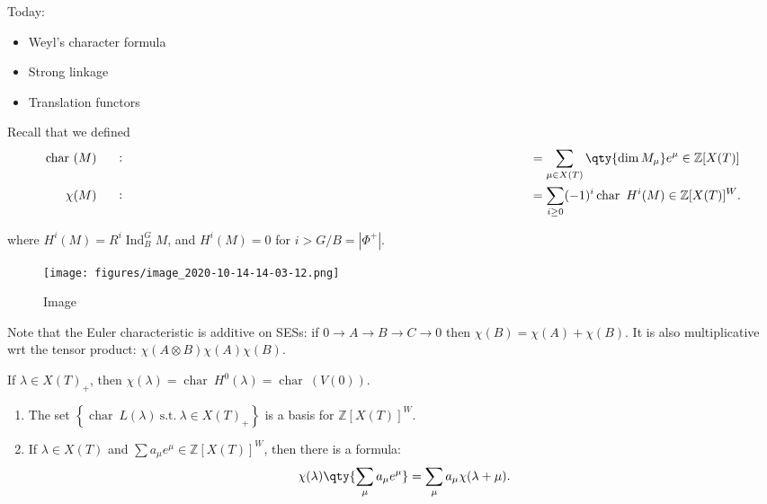 Today:

\begin{itemize}
\item
  Weyl's character formula
\item
  Strong linkage
\item
  Translation functors
\end{itemize}

Recall that we defined
\begin{align*}   \operatorname{char}~(M) &\mathrel{\vcenter{:}}=\sum_{\mu \in X(T)} \qty{\dim M_\mu} e^{\mu} \in {\mathbb{Z}}[X(T)]\\ \chi(M) &\mathrel{\vcenter{:}}=\sum_{i\geq 0} (-1)^i \operatorname{char}~H^i(M) \in {\mathbb{Z}}[X(T)]^W .\end{align*}

where \(H^i(M) = R^i \operatorname{Ind}_B^G M\), and \(H^i(M) =0\) for
\(i> G/B = {\left\lvert {\Phi^+} \right\rvert}\).

\begin{figure}
\centering
\texttt{[image: figures/image\_2020-10-14-14-03-12.png]}
\caption{Image}
\end{figure}

Note that the Euler characteristic is additive on SESs: if
\(0\to A\to B\to C\to 0\) then \(\chi(B) = \chi(A) + \chi(B)\). It is
also multiplicative wrt the tensor product:
\(\chi(A\otimes B) \chi(A) \chi(B)\).


\begin{remark}

\begin{remark}

If \(\lambda \in X(T)_+\), then
\(\chi(\lambda) = \operatorname{char}~H^0(\lambda) = \operatorname{char}~(V(0))\).

\end{remark}

\end{remark}

\begin{proposition}[?]

\begin{proposition}[?]

\hfill

\begin{enumerate}
\def\labelenumi{\arabic{enumi}.}
\item
  The set
  \(\left\{{\operatorname{char}~L(\lambda) ~{\text{s.t.}}~\lambda\in X(T)_+}\right\}\)
  is a basis for \({\mathbb{Z}}[X(T)]^W\).
\item
  If \(\lambda \in X(T)\) and
  \(\sum a_\mu e^\mu \in {\mathbb{Z}}[X(T)]^W\), then there is a
  formula:
  \begin{align*}       \chi(\lambda) \qty{ \sum_\mu a_\mu e^\mu } = \sum_\mu a_\mu \chi(\lambda + \mu)     .\end{align*}
\end{enumerate}

\end{proposition}

\end{proposition}

